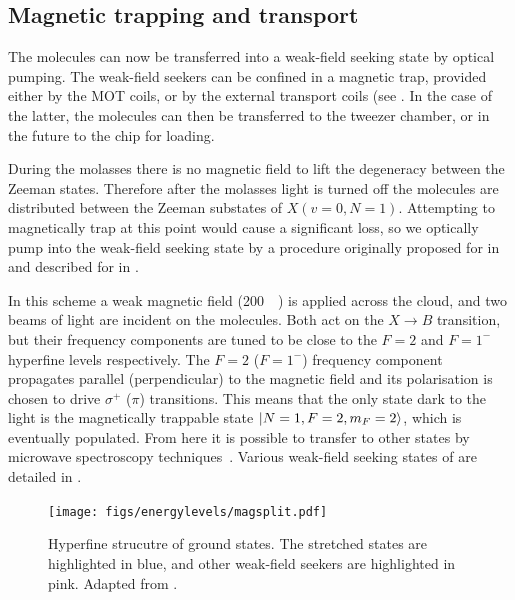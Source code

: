 \subsection{Magnetic trapping and transport}

The molecules can now be transferred into a weak-field seeking state by optical
pumping. The weak-field seekers can be confined in a magnetic trap, provided
either by the MOT coils, or by the external transport coils (see
. In the case of the
latter, the molecules can then be transferred to the tweezer chamber, or in the
future to the chip for loading.

During the molasses there is no magnetic field to lift the degeneracy between
the Zeeman states. Therefore after the molasses light is turned off the
molecules are distributed between the Zeeman substates of $X(v=0, N=1)$.
Attempting to magnetically trap at this point would cause a significant loss,
so we optically pump into the weak-field seeking state by a procedure originally
proposed for \SrF{} in  %
and described for \CaF{} in .

In this scheme a weak magnetic field (\SI{200}{\milli\gauss}) is applied across
the cloud, and two beams of light are incident on the molecules. Both act on
the $X\rightarrow B$ transition, but their frequency components are tuned to be
close to the $F=2$ and $F=1^-$ hyperfine levels respectively. The $F=2$
($F=1^-$) frequency component propagates parallel (perpendicular) to the
magnetic field and its polarisation is chosen to drive $\sigma^+$ ($\pi$)
transitions. This means that the only state dark to the light is the
magnetically trappable state $\ket{N=1, F=2, m_F=2}$, which is eventually
populated. From here it is possible to transfer to other states by microwave
spectroscopy techniques~\cite{WilliamsMagnetic2018}. Various weak-field seeking
states of \CaF{} are detailed in .

\begin{figure}
  \centering
  \texttt{[image: figs/energylevels/magsplit.pdf]}
  \caption[Hyperfine structe in \CaF{}]{
    Hyperfine strucutre of \CaF{} ground states. The stretched states
    are highlighted in blue, and other weak-field seekers are highlighted in
    pink. Adapted from .}
  \label{overview:fig:magtrapstates}
\end{figure}


